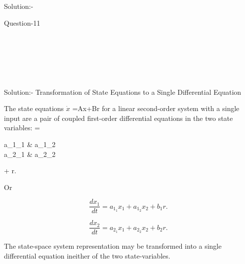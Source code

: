 \documentclass[journal,12pt,twocolumn]{IEEEtran}
\begin{document}
\begin{frame}{Solution:- }
\begin{frame}{Question-11 }
\begin{description}[font=$\bullet$~\normalfont\scshape\color{blue!50!black}]
\begin{tabular}{cc}
    \end{tabular}

\end{description}
\end{frame}
\\\\\\\
\begin{frame}{Solution:- }
 Transformation of State Equations to a Single Differential Equation
\begin{description}[font=$\bullet$~\normalfont\scshape\color{red!50!black}]
The state equations $\dot{x}$ =Ax+Br for a linear second-order system with a single input are a pair of coupled first-order differential equations in the two state variables:
 = 
\begin{bmatrix} a_1_1 & a_1_2 \\ a_2_1 & a_2_2 
\end{bmatrix} 
\left[ 
\begin{array}{c} x_1 \\ x_2 
\end{array}
\right]
+
\left[
\begin{array}{c} b_1 \\ b_2 
\end{array}
\right]
r.
\end{description}
\begin{description}
Or
\end{description}
\begin{description}
$$\dfrac{dx_1}{dt}= a_1_1x_1 + a_1_2x_2 + b_1r.$$
\end{description}
\begin{description}
$$\dfrac{dx_2}{dt}= a_2_1x_1 + a_2_2x_2 + b_2r.$$
\end{description}
\begin{description}
The state-space system representation may be transformed into a single differential equation ineither of the two state-variables.
\end{description}

\end{frame}


\end{frame}
\end{document}
